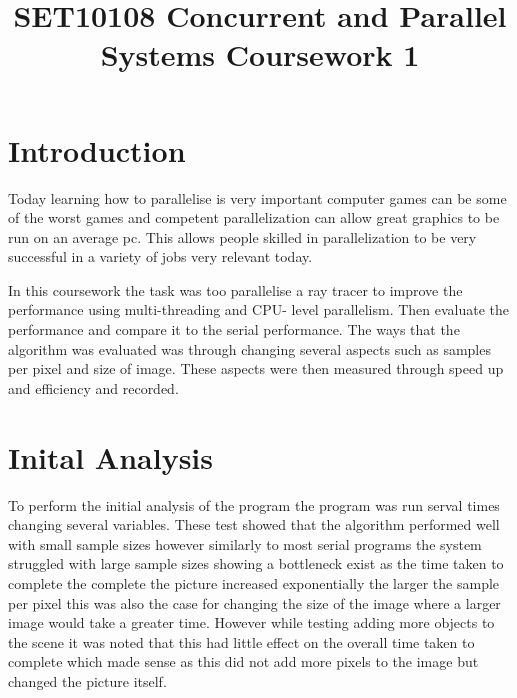 \documentclass[journal,transmag]{IEEEtran}
\begin{document}
\title{SET10108 Concurrent and Parallel Systems \linebreak Coursework 1}



\maketitle

\section{Introduction}
 Today learning how to parallelise is very important computer games can be some of the worst games and competent parallelization can allow great graphics to be run on an average pc. This allows people skilled in parallelization to be very successful in a variety of jobs very relevant today.\par\noindent
 
 In this coursework the task was too parallelise a ray tracer to improve the performance using multi-threading and CPU- level parallelism. Then evaluate the performance and compare it to the serial performance.  The ways that the algorithm was evaluated was through changing several aspects such as samples per pixel and size of image. These aspects were then measured through speed up and efficiency and recorded.
 

\section{Inital Analysis}
To perform the initial analysis of the program the program was run serval times changing several variables. These test showed that the algorithm performed well with small sample sizes however similarly to most serial programs the system struggled with large sample sizes showing a bottleneck exist as the time taken to complete the complete the picture increased exponentially the larger the sample per pixel this was also the case for changing the size of the image where a larger image would take a greater time. However while testing adding more objects to the scene it was noted that this had little effect on the overall time taken to complete which made sense as this did not add more pixels to the image but changed the picture itself.
\end{document}
